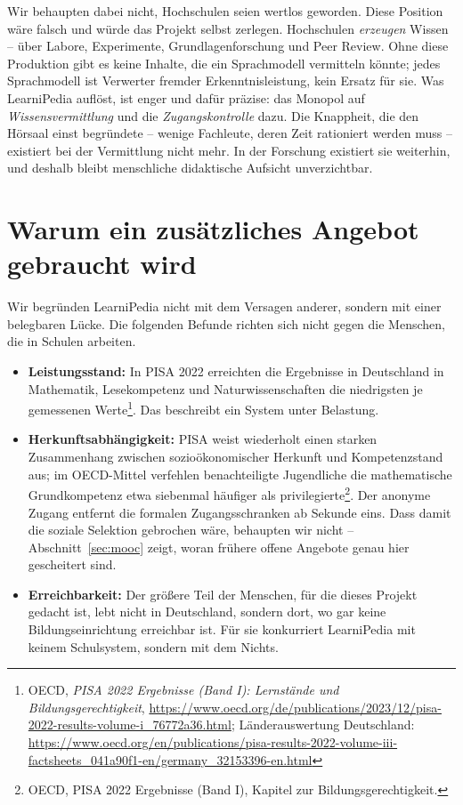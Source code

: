 \documentclass[11pt,a4paper]{article}
\begin{document}
Wir behaupten dabei nicht, Hochschulen seien wertlos geworden. Diese Position wäre falsch und würde das Projekt selbst zerlegen. Hochschulen \textit{erzeugen} Wissen -- über Labore, Experimente, Grundlagenforschung und Peer Review. Ohne diese Produktion gibt es keine Inhalte, die ein Sprachmodell vermitteln könnte; jedes Sprachmodell ist Verwerter fremder Erkenntnisleistung, kein Ersatz für sie. Was LearniPedia auflöst, ist enger und dafür präzise: das Monopol auf \textit{Wissensvermittlung} und die \textit{Zugangskontrolle} dazu. Die Knappheit, die den Hörsaal einst begründete -- wenige Fachleute, deren Zeit rationiert werden muss -- existiert bei der Vermittlung nicht mehr. In der Forschung existiert sie weiterhin, und deshalb bleibt menschliche didaktische Aufsicht unverzichtbar.

\section{Warum ein zusätzliches Angebot gebraucht wird}
Wir begründen LearniPedia nicht mit dem Versagen anderer, sondern mit einer belegbaren Lücke. Die folgenden Befunde richten sich nicht gegen die Menschen, die in Schulen arbeiten.
\begin{itemize}
    \item \textbf{Leistungsstand:} In PISA 2022 erreichten die Ergebnisse in Deutschland in Mathematik, Lesekompetenz und Naturwissenschaften die niedrigsten je gemessenen Werte\footnote{OECD, \textit{PISA 2022 Ergebnisse (Band I): Lernstände und Bildungsgerechtigkeit}, \url{https://www.oecd.org/de/publications/2023/12/pisa-2022-results-volume-i_76772a36.html}; Länderauswertung Deutschland: \url{https://www.oecd.org/en/publications/pisa-results-2022-volume-iii-factsheets_041a90f1-en/germany_32153396-en.html}}. Das beschreibt ein System unter Belastung.
    \item \textbf{Herkunftsabhängigkeit:} PISA weist wiederholt einen starken Zusammenhang zwischen sozioökonomischer Herkunft und Kompetenzstand aus; im OECD-Mittel verfehlen benachteiligte Jugendliche die mathematische Grundkompetenz etwa siebenmal häufiger als privilegierte\footnote{OECD, PISA 2022 Ergebnisse (Band I), Kapitel zur Bildungsgerechtigkeit.}. Der anonyme Zugang entfernt die formalen Zugangsschranken ab Sekunde eins. Dass damit die soziale Selektion gebrochen wäre, behaupten wir nicht -- Abschnitt~\ref{sec:mooc} zeigt, woran frühere offene Angebote genau hier gescheitert sind.
    \item \textbf{Erreichbarkeit:} Der größere Teil der Menschen, für die dieses Projekt gedacht ist, lebt nicht in Deutschland, sondern dort, wo gar keine Bildungseinrichtung erreichbar ist. Für sie konkurriert LearniPedia mit keinem Schulsystem, sondern mit dem Nichts.
\end{itemize}
\end{document}
